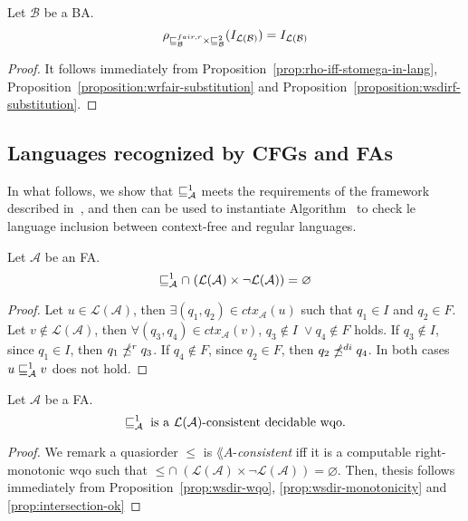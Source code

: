 \begin{proposition}
\label{prop:wrfair-wrdirf-ok}
Let $\mathcal{B}$ be a BA.
\[ \rho_{\sqsubseteq_{\mathcal{B}}^{fair,r} \times \sqsubseteq_{\mathcal{B}}^{2}}(I_{\mathcal{L}(\mathcal{B})}) = I_{\mathcal{L}(\mathcal{B})} \]
\end{proposition}

\begin{proof}
It follows immediately from Proposition~\ref{prop:rho-iff-stomega-in-lang},
Proposition~\ref{proposition:wrfair-substitution}
and Proposition~\ref{proposition:wsdirf-substitution}.
\end{proof}


\subsection{Languages recognized by CFGs and FAs}
\label{sec:simulations-for-cfg}

In what follows, we show that $\sqsubseteq^1_{\mathcal{A}}$ meets the requirements of
the framework described in~\cite{ganty2019language}, and then can be used to
instantiate Algorithm~ to check le language inclusion
between context-free and regular languages.

\begin{proposition}
\label{prop:intersection-ok}
Let $\mathcal{A}$ be an FA.
\[ \sqsubseteq^1_{\mathcal{A}} \cap \; (\mathcal{L}(\mathcal{A}) \times \neg \mathcal{L}(\mathcal{A})) = \varnothing \]
\end{proposition}

\begin{proof}
Let $u \in \mathcal{L}(\mathcal{A})$, then $\exists(q_1,q_2) \in ctx_{\mathcal{A}}(u)$ such that $q_1 \in I$ and $q_2 \in F$.
Let $v \notin \mathcal{L}(\mathcal{A})$, then $\forall (q_3,q_4) \in ctx_{\mathcal{A}}(v)$, $ q_3 \notin I \; \vee q_4 \notin F$ holds.
If $ q_3 \notin I $, since $ q_1 \in I$, then $q_1 \npreceq^r q_3$.
If $ q_4 \notin F $, since $ q_2 \in F $, then $q_2 \npreceq^{di} q_4$.
In both cases $u \sqsubseteq^1_{\mathcal{A}} v$ does not hold.
\end{proof}

\begin{proposition}
Let $\mathcal{A}$ be a FA.
\[ \sqsubseteq^1_{\mathcal{A}} \; \textrm{is a $\mathcal{L}(\mathcal{A})$-consistent decidable wqo.} \]
\end{proposition}

\begin{proof}
We remark a quasiorder $\leq$ is $\lang{A}$-\emph{consistent} iff it is a computable
right-monotonic wqo such that $ \leq \cap \; (\mathcal{L}(\mathcal{A}) \times \neg \mathcal{L}(\mathcal{A})) = \varnothing $.
Then, thesis follows immediately from Proposition~\ref{prop:wsdir-wqo}, \ref{prop:wsdir-monotonicity}
and \ref{prop:intersection-ok}
\end{proof}

